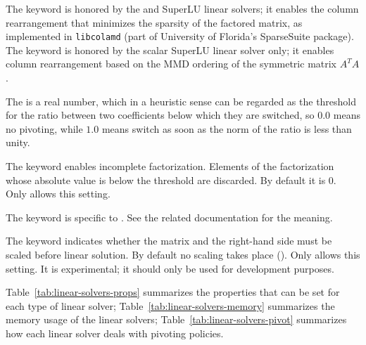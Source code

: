 The keyword  is honored by the  and SuperLU linear solvers;
it enables the column rearrangement that minimizes the sparsity
of the factored matrix, as implemented in \texttt{libcolamd}
(part of University of Florida's SparseSuite package).
The keyword  is honored by 
the scalar SuperLU linear solver only; it enables column rearrangement
based on the MMD ordering of the symmetric matrix $A^T A$.


The  is a real number, which in a heuristic sense 
can be regarded as the threshold for the ratio between two coefficients 
below which they are switched, so $ 0.0 $ means no pivoting, 
while $ 1.0 $ means switch as soon as the norm of the ratio 
is less than unity.

The keyword  enables incomplete factorization.
Elements of the factorization whose absolute value is below
the  threshold are discarded.
By default it is 0.
Only  allows this setting.

The keyword  is specific to .
See the related documentation for the meaning.

The keyword  indicates whether the matrix and the right-hand side
must be scaled before linear solution.
By default no scaling takes place ().
Only  allows this setting.
It is experimental; it should only be used for development purposes.

Table~\ref{tab:linear-solvers-props} summarizes the properties that can be set
for each type of linear solver; Table~\ref{tab:linear-solvers-memory}
summarizes  the memory usage of the linear solvers;
Table~\ref{tab:linear-solvers-pivot}
summarizes how each linear solver deals with pivoting policies.

